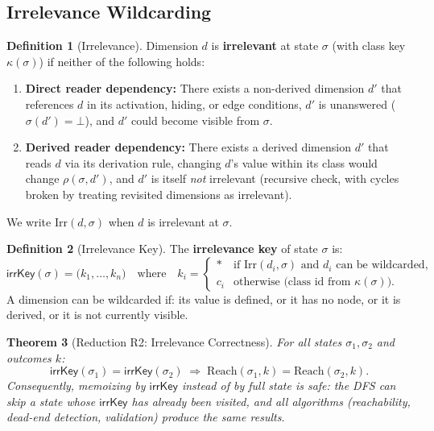 \documentclass[11pt]{article}
\newtheorem{theorem}{Theorem}[section]
\theoremstyle{definition}
\newtheorem{definition}[theorem]{Definition}
\newcommand{\sel}{\sigma}              %
\newcommand{\res}[2]{\rho(#1,#2)}      %
\newcommand{\ik}{\mathsf{irrKey}}      %
\newcommand{\ck}{\kappa}               %
\newcommand{\Reach}{\mathrm{Reach}}    %
\newcommand{\Irr}{\mathrm{Irr}}        %
\newcommand{\wildcard}{*}
\begin{document}
\subsection{Irrelevance Wildcarding}\label{sec:irrelevance}

\begin{definition}[Irrelevance]\label{def:irr}
Dimension $d$ is \textbf{irrelevant} at state $\sel$ (with class key
$\ck(\sel)$) if neither of the following holds:
\begin{enumerate}[label=(\alph*)]
  \item \textbf{Direct reader dependency:} There exists a non-derived
        dimension $d'$ that references $d$ in its activation, hiding, or
        edge conditions, $d'$ is unanswered ($\sel(d')=\bot$), and $d'$
        could become visible from $\sel$.
  \item \textbf{Derived reader dependency:} There exists a derived
        dimension $d'$ that reads $d$ via its derivation rule, changing
        $d$'s value within its class would change $\res{\sel}{d'}$, and
        $d'$ is itself \emph{not} irrelevant (recursive check, with
        cycles broken by treating revisited dimensions as irrelevant).
\end{enumerate}
We write $\Irr(d,\sel)$ when $d$ is irrelevant at $\sel$.
\end{definition}

\begin{definition}[Irrelevance Key]\label{def:irrkey}
The \textbf{irrelevance key} of state $\sel$ is:
\[
  \ik(\sel) = \bigl(k_1,\dots,k_n\bigr)
  \quad\text{where}\quad
  k_i =
  \begin{cases}
    \wildcard & \text{if } \Irr(d_i,\sel)
                \text{ and } d_i \text{ can be wildcarded},\\
    c_i       & \text{otherwise (class id from } \ck(\sel)\text{)}.
  \end{cases}
\]
A dimension can be wildcarded if: its value is defined, or it has no node,
or it is derived, or it is not currently visible.
\end{definition}

\begin{theorem}[Reduction R2: Irrelevance Correctness]\label{thm:irr}
For all states $\sel_1, \sel_2$ and outcomes $k$:
\[
  \ik(\sel_1) = \ik(\sel_2)
  \;\Longrightarrow\;
  \Reach(\sel_1,k) = \Reach(\sel_2,k).
\]
Consequently, memoizing by $\ik$ instead of by full state is safe: the DFS
can skip a state whose $\ik$ has already been visited, and all algorithms
(reachability, dead-end detection, validation) produce the same results.
\end{theorem}
\end{document}
